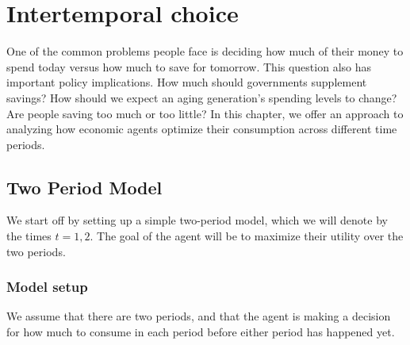 \chapter{Intertemporal choice}

One of the common problems people face is deciding how much of their money to spend today versus how much to save for tomorrow. This question also has important policy implications. How much should governments supplement savings? How should we expect an aging generation's spending levels to change? Are people saving too much or too little? In this chapter, we offer an approach to analyzing how economic agents optimize their consumption across different time periods.

\section{Two Period Model}
We start off by setting up a simple two-period model, which we will denote by the times $t = 1, 2$. The goal of the agent will be to maximize their utility over the two periods. 

\subsection*{Model setup}
We assume that there are two periods, and that the agent is making a decision for how much to consume in each period before either period has happened yet. 

